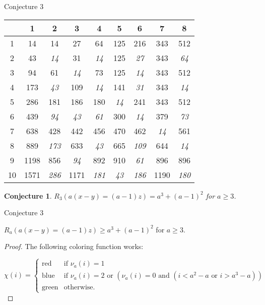 \documentclass{beamer}
\newtheorem{conjecture}[theorem]{Conjecture}
\begin{document}
\begin{frame}{Conjecture 3}
 
\begin{center}
	\begin{tabular}{c|cccccccc}
		\diagbox{$b$}{$a$} & 1 & 2 & 3 & 4 &5&6&7&8\\
		\hline
		1 & 14 & 14 & 27 & 64 &125 &216 & 343 & 512\\
		2 & 43 & \textit{14} & {\color{red}31} & \textit{14} &125 &\textit{27} &343&\textit{64} \\
		3 & 94 & 61 & \textit{14} & {\color{red}73} &125&\textit{14}&343&512\\
		4 & 173 & \textit{43} & 109 & \textit{14} &{\color{red}141}&\textit{31}&343&\textit{14} \\
		5 & 286 & 181 & 186 & 180 &\textit{14} &{\color{red}241} & 343 & 512\\
		6 & 439 & \textit{94} & \textit{43}  & \textit{61} &300&\textit{14}& {\color{red}379} &\textit{73}\\
		7 & 638 & 428 & 442 & 456 &470&462 &\textit{14}&{\color{red}561}\\
		8 & 889 & \textit{173} & 633 & \textit{43}&665&\textit{109}& 644 &\textit{14}\\
		9 & 1198 & 856 & \textit{94}& 892 & 910 & \textit{61} & 896 & 896\\
		10 & 1571 & \textit{286} & 1171 & \textit{181} &\textit{43}& \textit{186} & 1190 &\textit{180}
	\end{tabular}
\end{center}
\pause \begin{conjecture}
	$R_3(a(x-y) = (a-1)z) = a^3+(a-1)^2$ for $a \ge 3$. 
\end{conjecture}
\end{frame}
\begin{frame}{Conjecture 3}
\begin{theorem}[CW]
	$R_a(a(x-y) = (a-1)z) \ge a^3+(a-1)^2$ for $a\ge 3$.
\end{theorem}
\begin{proof}
	The following coloring function works:
	
	$$\chi(i) = \begin{cases}
	\text{red} & \text{if } \nu_a(i) = 1 \\
	\text{blue} & \text{if } \nu_a(i) = 2 \text{ or } (\nu_a(i) = 0 \text{ and } (i < a^2 - a \text{ or } i>a^3-a))\\
	\text{green} & \text{otherwise.} 
	\end{cases}$$
\end{proof}
\end{frame}
\end{document}
